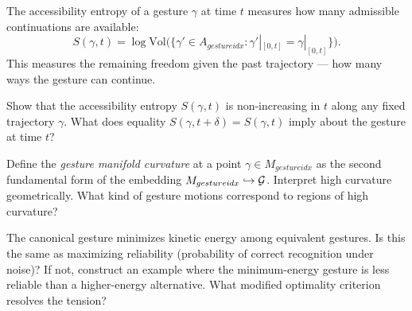 The accessibility entropy of a gesture $\gamma$ at time $t$ measures
how many admissible continuations are available:
\[
  S(\gamma, t) = \log \mathrm{Vol}\bigl(\{\gamma' \in A_{gestureidx} :
  \gamma'|_{[0,t]} = \gamma|_{[0,t]}\}\bigr).
\]
This measures the remaining freedom given the past trajectory — how
many ways the gesture can continue.

\begin{exercise}
  Show that the accessibility entropy $S(\gamma, t)$ is non-increasing
  in $t$ along any fixed trajectory $\gamma$. What does equality
  $S(\gamma, t+\delta) = S(\gamma, t)$ imply about the gesture at time $t$?
\end{exercise}

\begin{exercise}
  Define the \emph{gesture manifold curvature} at a point
  $\gamma \in M_{gestureidx}$ as the second fundamental form of the
  embedding $M_{gestureidx} \hookrightarrow \mathcal{G}$. Interpret
  high curvature geometrically. What kind of gesture motions
  correspond to regions of high curvature?
\end{exercise}

\begin{exercise}[title={Open problem}]
  The canonical gesture minimizes kinetic energy among equivalent
  gestures. Is this the same as maximizing reliability (probability
  of correct recognition under noise)? If not, construct an example
  where the minimum-energy gesture is less reliable than a higher-energy
  alternative. What modified optimality criterion resolves the tension?
\end{exercise}
